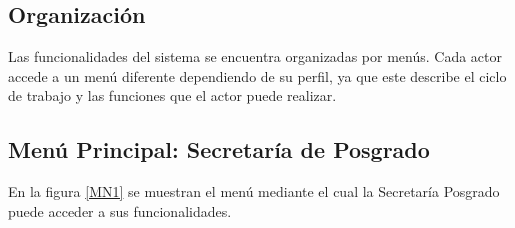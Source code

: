   






  
\subsection{Organización}
Las funcionalidades del sistema se encuentra organizadas por menús. Cada actor accede a un menú diferente dependiendo de su perfil, ya que este describe el ciclo de trabajo y las funciones que el actor puede realizar.


\hypertarget{menu:SP-MenuEA}{}	
\subsection{Menú Principal: Secretaría de Posgrado}
En la figura \ref{MN1} se muestran el menú mediante el cual la Secretaría Posgrado puede acceder a sus funcionalidades.


